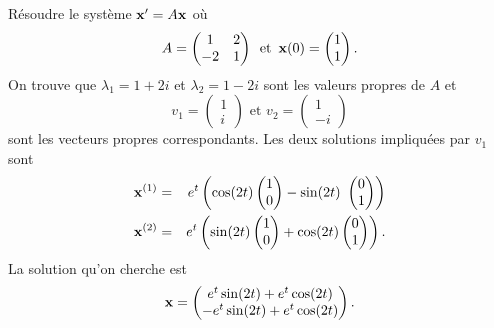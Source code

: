{\begin{example}
  \label{exe:21}
  Résoudre le système $\mathbf{x}' = A\mathbf{x}$ où 
  \begin{displaymath}
    A  =
    \begin{pmatrix}
      1 & 2 \\
      -2 & 1
    \end{pmatrix} \, \text{ et } \, \mathbf{x}(0) =
    \begin{pmatrix}
      1\\1
    \end{pmatrix}. 
  \end{displaymath}
 On trouve que $\lambda_1 = 1 + 2 i$ et $\lambda_2 = 1 - 2i$ sont les valeurs propres de $A$ et 
 \begin{displaymath}
   v_1 =
   \begin{pmatrix}
     1\\i
   \end{pmatrix} \text{ et } v_2 =
   \begin{pmatrix}
     1 \\ -i
   \end{pmatrix}
 \end{displaymath}
sont les vecteurs propres correspondants. 
Les deux solutions impliquées par $v_1$ sont 
\begin{eqnarray*}
  \mathbf{x}^{(1)} & = & e^{ t} \left(\cos ( 2t)
                 \begin{pmatrix}
                   1\\0
                 \end{pmatrix}
- \sin (2t)\
  \begin{pmatrix}
    0\\1
  \end{pmatrix}
\right) \\
  \mathbf{x}^{(2)} & = &  e^{t} \left(\sin ( 2t )
                 \begin{pmatrix}
                   1\\0
                 \end{pmatrix}
+ \cos(2t)
  \begin{pmatrix}
    0\\1
  \end{pmatrix}
\right). 
\end{eqnarray*} 
La solution qu'on cherche est 
\begin{displaymath}
  \mathbf{x} = \begin{pmatrix}
           e^{t} \sin (2t) + e^{t} \cos(2t) \\
           - e^{t} \sin(2t) + e^{t} \cos(2t)
         \end{pmatrix}.
\end{displaymath}


\end{example}}
